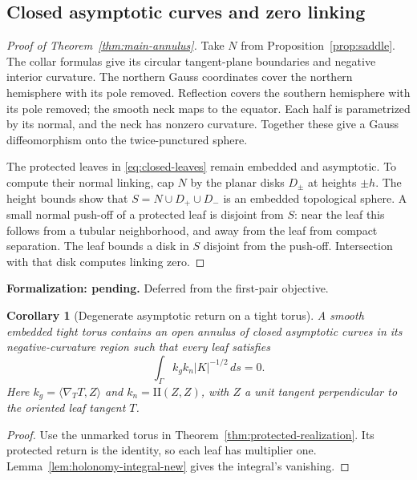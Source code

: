 \documentclass[11pt]{amsart}
\newtheorem{corollary}[theorem]{Corollary}
\theoremstyle{definition}
\theoremstyle{remark}
\newcommand{\II}{\mathrm{II}}\newcommand{\Gmap}{\mathcal G}
\numberwithin{equation}{section}
\begin{document}
\subsection{Closed asymptotic curves and zero linking}
\begin{proof}[Proof of Theorem~\ref{thm:main-annulus}]
Take $N$ from Proposition~\ref{prop:saddle}. The collar formulas give
its circular tangent-plane boundaries and negative interior curvature.
The northern Gauss coordinates cover the northern hemisphere with its
pole removed. Reflection covers the southern hemisphere with its pole
removed; the smooth neck maps to the equator. Each half is parametrized
by its normal, and the neck has nonzero curvature. Together these give
a Gauss diffeomorphism onto the twice-punctured sphere.

The protected leaves in \eqref{eq:closed-leaves} remain embedded and
asymptotic. To compute their normal linking, cap $N$ by the planar disks
$D_\pm$ at heights $\pm h$. The height bounds show that
$S=N\cup D_+\cup D_-$ is an embedded topological sphere.
A small normal push-off of a protected leaf is disjoint from $S$:
near the leaf this follows from a tubular neighborhood, and away from
the leaf from compact separation. The leaf bounds a disk in $S$ disjoint
from the push-off. Intersection with that disk computes linking zero.
\end{proof}

\par\noindent\textbf{Formalization: pending.} Deferred from the first-pair objective.\par
\begin{corollary}[Degenerate asymptotic return on a tight torus]
\label{cor:HK-degenerate}
A smooth embedded tight torus contains an open annulus of closed
asymptotic curves in its negative-curvature region such that every leaf
satisfies
\[
 \int_\Gamma k_gk_n|K|^{-1/2}\,ds=0.
\]
Here $k_g=\langle\nabla_TT,Z\rangle$ and $k_n=\II(Z,Z)$, with $Z$
a unit tangent perpendicular to the oriented leaf tangent $T$.
\end{corollary}
\begin{proof}
Use the unmarked torus in Theorem~\ref{thm:protected-realization}.
Its protected return is the identity, so each leaf has multiplier one.
Lemma~\ref{lem:holonomy-integral-new} gives the integral's vanishing.
\end{proof}
\end{document}
